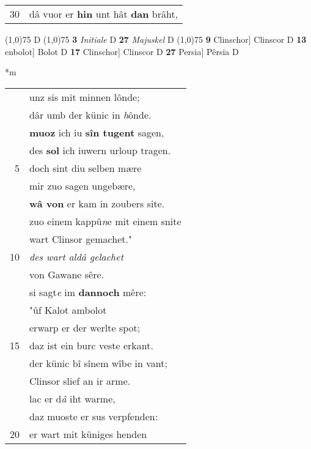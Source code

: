 \documentclass[8pt,a4paper,notitlepage]{article}
\begin{document}
\begin{table}[ht]
\begin{minipage}[t]{0.5\linewidth}
\begin{tabular}{rl}
30 & dâ vuor er \textbf{hin} unt hât \textbf{dan} brâht,\\ 
\end{tabular}
\scriptsize
\line(1,0){75} \newline
D \newline
\line(1,0){75} \newline
\textbf{3} \textit{Initiale} D  \textbf{27} \textit{Majuskel} D  \newline
\line(1,0){75} \newline
\textbf{9} Clinschor] Clinscor D \textbf{13} enbolot] Bolot D \textbf{17} Clinschor] Clinscor D \textbf{27} Persia] Pêrsia D \newline
\end{minipage}
\hspace{0.5cm}
\begin{minipage}[t]{0.5\linewidth}
\small
\begin{center}*m
\end{center}
\begin{tabular}{rl}
 & unz sis mit minnen lônde;\\ 
 & dâr umb der künic in \textit{h}ônde.\\ 
 & \textbf{muoz} ich iu \textbf{sîn tugent} sagen,\\ 
 & des \textbf{sol} ich iuwern urloup tragen.\\ 
5 & doch sint diu selben mære\\ 
 & mir zuo sagen ungebære,\\ 
 & \textbf{wâ von} er kam in zoubers site.\\ 
 & zuo einem kappû\textit{n}e mit einem snite\\ 
 & wart Clinsor gemachet."\\ 
10 & \textit{des wart aldâ gelachet}\\ 
 & von Gawane sêre.\\ 
 & si sagt\textit{e} im \textbf{dannoch} mêre:\\ 
 & "ûf Kalot ambolot\\ 
 & erwarp er der werlte spot;\\ 
15 & daz ist ein burc veste erkant.\\ 
 & der künic bî sînem wîbe in vant;\\ 
 & Clinsor slief an ir arme.\\ 
 & lac er d\textit{â} iht warme,\\ 
 & daz muoste er sus verpfenden:\\ 
20 & er wart mit küniges henden\\ 

\end{tabular}
\end{minipage}
\end{table}
\end{document}
